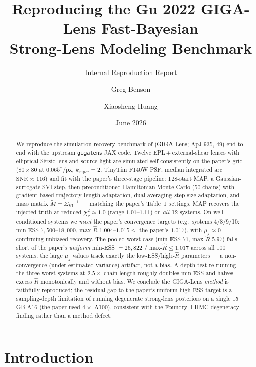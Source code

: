 \documentclass[11pt,letterpaper]{article}
\title{Reproducing the Gu 2022 GIGA-Lens Fast-Bayesian\\
       Strong-Lens Modeling Benchmark}
\author{Greg Benson \and Xiaosheng Huang}
\date{June 2026}
\newcommand{\asec}{\ensuremath{^{\prime\prime}}}
\newcommand{\Rhat}{\ensuremath{\hat{R}}}
\newcommand{\chisq}{\ensuremath{\chi^2_\nu}}
\newcommand{\muz}{\ensuremath{\mu_z}}
\newcommand{\SigmaVI}{\ensuremath{\Sigma_{\mathrm{VI}}}}
\begin{document}
\maketitle
\subtitle{Internal Reproduction Report}

\begin{abstract}
We reproduce the simulation-recovery benchmark of \citet{gu2022gigalens}
(GIGA-Lens; ApJ 935, 49) end-to-end with the upstream \texttt{gigalens}
JAX code. Twelve EPL\,$+$\,external-shear lenses with elliptical-S\'ersic
lens and source light are simulated self-consistently on the paper's grid
($80\times80$ at $0.065\asec$/px, $k_{\mathrm{super}}=2$, TinyTim F140W PSF,
median integrated arc $\mathrm{SNR}\approx116$) and fit with the paper's
three-stage pipeline: 128-start MAP, a Gaussian-surrogate SVI step, then
preconditioned Hamiltonian Monte Carlo (50 chains) with gradient-based
trajectory-length adaptation, dual-averaging step-size adaptation, and mass
matrix $\tilde{M}=\SigmaVI^{-1}$ --- matching the paper's Table~1 settings.
MAP recovers the injected truth at reduced $\chisq\approx1.0$ (range
$1.01$--$1.11$) on \emph{all} 12 systems. On well-conditioned systems we
\emph{meet} the paper's convergence targets (e.g.\ systems 4/8/9/10:
min-ESS $7{,}500$--$18{,}000$, max-$\Rhat$ $1.004$--$1.015 \le$ the paper's
$1.017$), with $\muz\approx0$ confirming unbiased recovery. The pooled
worst case (min-ESS $71$, max-$\Rhat$ $5.97$) falls short of the paper's
\emph{uniform} min-ESS $=26{,}822$ / max-$\Rhat\le1.017$ across all 100
systems; the large $\muz$ values track exactly the low-ESS/high-$\Rhat$
parameters --- a non-convergence (under-estimated-variance) artifact, not a
bias. A depth test re-running the three worst systems at $2.5\times$ chain
length roughly doubles min-ESS and halves excess $\Rhat$ monotonically and
without bias. We conclude the GIGA-Lens \emph{method} is faithfully
reproduced; the residual gap to the paper's uniform high-ESS target is a
sampling-depth limitation of running degenerate strong-lens posteriors on a
single 15\,GB A16 (the paper used $4\times$ A100), consistent with the
Foundry~I \citep{huang2025foundry1} HMC-degeneracy finding rather than a
method defect.
\end{abstract}

\tableofcontents

\bigskip

\section{Introduction}
\end{document}
